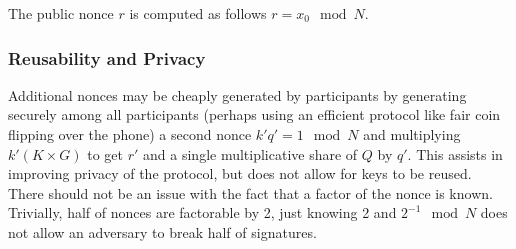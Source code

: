 \documentclass{article}
\newcommand{\mulOT}{\pi_{*}}
\begin{document}
The public nonce $r$ is computed as follows $ r = x_0 \mod N $.

\begin{comment}
Next, we compute the inverse as a secret share using Oblivious Transfer Multiplication.
\begin{equation*}
    \begin{split}
        Q = K^{-1} &= \prod_{i=1}^n q_i \\
        &= q_1\cdot q_2  \prod_{i=3}^n q_i\\ 
        &= \mulOT(q_1, q_2) \prod_{i=3}^n q_i \\
        &= (\tau_1 + \tau_2) \prod_{i=3}^n q_i \\
        &= \mulOT(\tau_1, q_3) \prod_{i=4}^n q_i + \mulOT(\tau_2, q_3) \prod_{i=4}^n q_i \\
        &= (\gamma_1 + \gamma_2) \prod_{i=4}^n q_i + (\gamma_3 + \gamma_4) \prod_{i=4}^n q_i\\
        &= \gamma_1  \prod_{i=4}^n q_i+ \gamma_3  \prod_{i=4}^n q_i+ (\gamma_2 + \gamma_4) \prod_{i=4}^n q_i \\
        &\cdots \\
        &= \mu_1 + \mu_2 \ldots \mu_n
    \end{split}
\end{equation*}
 By proprerly ordering terms and aggregating shares known by a single party, we keep the total number of interactions to $O(n^2)$. Fortunately, much of this computation is parallelizable, so the total asymptotic time should be closer to $O(n)$ as we have $n$ participants.

Note that in effect, $r$ is the aggregate public key and $\mu_i$ is a secret key known only to each participant.

\end{comment}

\subsubsection{Reusability and Privacy}

Additional nonces may be cheaply generated by
participants by generating securely among all participants (perhaps using an efficient protocol like fair
coin flipping over the phone) a second nonce $k'q' = 1 \mod N$ and multiplying $k'(K\times G)$ to get
$r'$ and a single multiplicative share of $Q$ by $q'$. This assists in improving privacy of the
protocol, but does not allow for keys to be reused. There should not be an issue with the fact that a factor of the nonce is known. Trivially, half of nonces are factorable by 2, just knowing 2 and $2^{-1} \mod N$ does not allow an adversary to break half of signatures.
\end{document}
